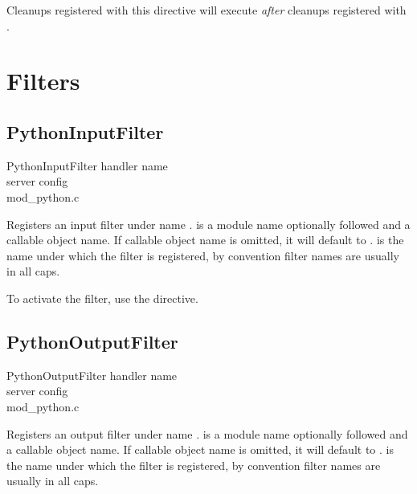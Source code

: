 Cleanups registered with this directive will execute \emph{after} cleanups
registered with .

\section{Filters\label{dir-filter}}

\subsection{PythonInputFilter\label{dir-filter-if}}

PythonInputFilter handler name\\
server config\\
mod_python.c

Registers an input filter  under name
.  is a module name optionally followed
\code{::} and a callable object name. If callable object name is
omitted, it will default to .  is the name under
which the filter is registered, by convention filter names are usually
in all caps.

To activate the filter, use the  directive.

\subsection{PythonOutputFilter\label{dir-filter-of}}

PythonOutputFilter handler name\\
server config\\
mod_python.c

Registers an output filter  under name
.  is a module name optionally followed
\code{::} and a callable object name. If callable object name is
omitted, it will default to .  is the name under
which the filter is registered, by convention filter names are usually
in all caps.

